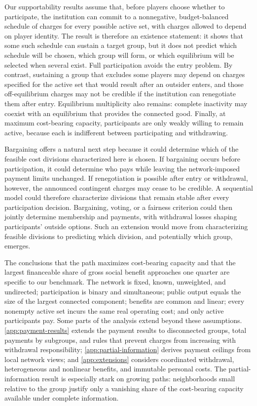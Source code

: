 \documentclass[preprint,12pt,authoryear]{elsarticle}
\begin{document}
Our supportability results assume that, before players choose whether to
participate, the institution can commit to a nonnegative, budget-balanced
schedule of charges for every possible active set, with charges allowed to
depend on player identity. The result is therefore an existence statement: it
shows that some such schedule can sustain a target group, but it does not
predict which schedule will be chosen, which group will form, or which
equilibrium will be selected when several exist. Full participation avoids the
entry problem. By contrast, sustaining a group that excludes some players may
depend on charges specified for the active set that would result after an
outsider enters, and those off-equilibrium charges may not be credible if the
institution can renegotiate them after entry. Equilibrium multiplicity also
remains: complete inactivity may coexist with an equilibrium that provides the
connected good. Finally, at maximum cost-bearing capacity, participants are
only weakly willing to remain active, because each is indifferent between
participating and withdrawing.

Bargaining offers a natural next step because it could determine which of the feasible cost divisions characterized here is chosen. If bargaining occurs
before participation, it could determine who pays while leaving the
network-imposed payment limits unchanged. If renegotiation is possible after
entry or withdrawal, however, the announced contingent charges may cease to be
credible. A sequential model could therefore characterize divisions that
remain stable after every participation decision. Bargaining, voting, or a
fairness criterion could then jointly determine membership and payments, with
withdrawal losses shaping participants' outside options. Such an extension
would move from characterizing feasible divisions to predicting which division,
and potentially which group, emerges.

The conclusions that the path maximizes cost-bearing capacity and that the
largest financeable share of gross social benefit approaches one quarter are
specific to our benchmark. The network is fixed, known, unweighted, and
undirected; participation is binary and simultaneous; public output equals the
size of the largest connected component; benefits are common and linear; every
nonempty active set incurs the same real operating cost; and only active
participants pay. Some parts of the analysis extend beyond these assumptions.
\ref{app:payment-results} extends the payment results to disconnected groups,
total payments by subgroups, and rules that prevent charges from increasing
with withdrawal responsibility; \ref{app:partial-information} derives payment
ceilings from local network views; and \ref{app:extensions} considers
coordinated withdrawal, heterogeneous and nonlinear benefits, and immutable
personal costs. The partial-information result is especially stark on growing
paths: neighborhoods small relative to the group justify only a vanishing
share of the cost-bearing capacity available under complete information.
\end{document}
